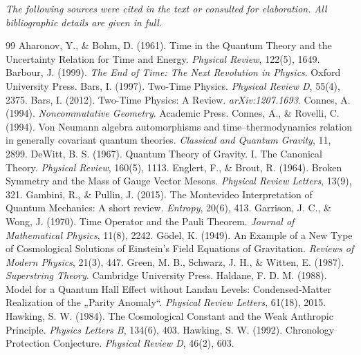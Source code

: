 \documentclass[11pt,a4paper]{article}
\begin{document}
\clearpage
{}
{}
\renewcommand{\refname}{Complete Bibliography}
{\small\itshape The following sources were cited in the text or consulted for elaboration. All bibliographic details are given in full.\par}
\vspace{0.4em}
\begingroup
\small
\begin{thebibliography}{99}
\setlength{\itemsep}{0.25em}
\setlength{\itemsep}{0.25em}
Aharonov, Y., \& Bohm, D. (1961). Time in the Quantum Theory and the Uncertainty Relation for Time and Energy. \emph{Physical Review}, 122(5), 1649.
Barbour, J. (1999). \emph{The End of Time: The Next Revolution in Physics}. Oxford University Press.
Bars, I. (1997). Two-Time Physics. \emph{Physical Review D}, 55(4), 2375.
Bars, I. (2012). Two-Time Physics: A Review. \emph{arXiv:1207.1693}.
Connes, A. (1994). \emph{Noncommutative Geometry}. Academic Press.
Connes, A., \& Rovelli, C. (1994). Von Neumann algebra automorphisms and time--thermodynamics relation in generally covariant quantum theories. \emph{Classical and Quantum Gravity}, 11, 2899.
DeWitt, B. S. (1967). Quantum Theory of Gravity. I. The Canonical Theory. \emph{Physical Review}, 160(5), 1113.
Englert, F., \& Brout, R. (1964). Broken Symmetry and the Mass of Gauge Vector Mesons. \emph{Physical Review Letters}, 13(9), 321.
Gambini, R., \& Pullin, J. (2015). The Montevideo Interpretation of Quantum Mechanics: A short review. \emph{Entropy}, 20(6), 413.
Garrison, J. C., \& Wong, J. (1970). Time Operator and the Pauli Theorem. \emph{Journal of Mathematical Physics}, 11(8), 2242.
Gödel, K. (1949). An Example of a New Type of Cosmological Solutions of Einstein's Field Equations of Gravitation. \emph{Reviews of Modern Physics}, 21(3), 447.
Green, M. B., Schwarz, J. H., \& Witten, E. (1987). \emph{Superstring Theory}. Cambridge University Press.
Haldane, F. D. M. (1988). Model for a Quantum Hall Effect without Landau Levels: Condensed-Matter Realization of the „Parity Anomaly``. \emph{Physical Review Letters}, 61(18), 2015.
Hawking, S. W. (1984). The Cosmological Constant and the Weak Anthropic Principle. \emph{Physics Letters B}, 134(6), 403.
Hawking, S. W. (1992). Chronology Protection Conjecture. \emph{Physical Review D}, 46(2), 603.

\end{thebibliography}
\end{document}
